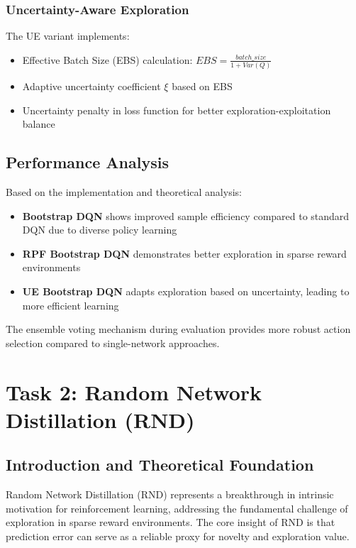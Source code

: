 \documentclass[12pt]{article}
\begin{document}
{{{\subsubsection{Uncertainty-Aware Exploration}
The UE variant implements:
\begin{itemize}
    \item Effective Batch Size (EBS) calculation: $EBS = \frac{batch\_size}{1 + Var(Q)}$
    \item Adaptive uncertainty coefficient $\xi$ based on EBS
    \item Uncertainty penalty in loss function for better exploration-exploitation balance
\end{itemize}

\subsection{Performance Analysis}

Based on the implementation and theoretical analysis:

\begin{itemize}
    \item \textbf{Bootstrap DQN} shows improved sample efficiency compared to standard DQN due to diverse policy learning
    \item \textbf{RPF Bootstrap DQN} demonstrates better exploration in sparse reward environments
    \item \textbf{UE Bootstrap DQN} adapts exploration based on uncertainty, leading to more efficient learning
\end{itemize}

The ensemble voting mechanism during evaluation provides more robust action selection compared to single-network approaches.

\section{Task 2: Random Network Distillation (RND)}

\subsection{Introduction and Theoretical Foundation}

Random Network Distillation (RND) \cite{burda2018exploration} represents a breakthrough in intrinsic motivation for reinforcement learning, addressing the fundamental challenge of exploration in sparse reward environments. The core insight of RND is that prediction error can serve as a reliable proxy for novelty and exploration value.

}}}
\end{document}
